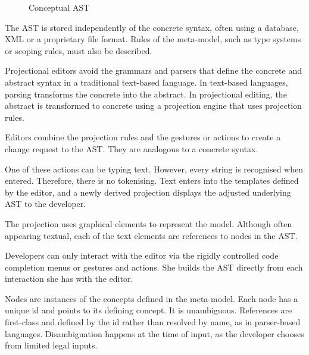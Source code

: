 \begin{figure}[h]
    \centering
    \caption{Conceptual AST}
    \label{fig:ast}
\end{figure}


The AST is stored independently of the concrete syntax, often using a database, XML or a proprietary file format.
Rules of the meta-model, such as type systems or scoping rules, must also be described.

Projectional editors avoid the grammars and parsers that define the concrete and abstract syntax in a traditional text-based language.
In text-based languages, parsing transforms the concrete into the abstract.
In projectional editing, the abstract is transformed to concrete using a projection engine that uses projection rules.

Editors combine the projection rules and the gestures or actions to create a change request to the AST.
They are analogous to a concrete syntax.

One of these actions can be typing text. 
However, every string is recognised when entered.
Therefore, there is no tokenising.
Text enters into the templates defined by the editor, and a newly derived projection displays the adjusted underlying AST to the developer.

The projection uses graphical elements to represent the model.
Although often appearing textual, each of the text elements are references to nodes in the AST.

Developers can only interact with the editor via the rigidly controlled code completion menus or gestures and actions.
She builds the AST directly from each interaction she has with the editor.

Nodes are instances of the concepts defined in the meta-model.
Each node has a unique id and points to its defining concept.
It is unambiguous.
References are first-class and defined by the id rather than resolved by name, as in parser-based languages.
Disambiguation happens at the time of input, as the developer chooses from limited legal inputs.

